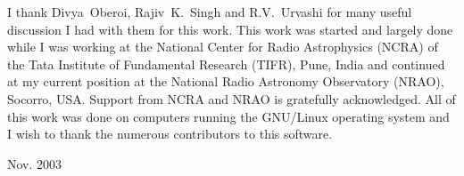 \documentclass[acmtoms,acmnow]{acmtrans2m}
\begin{document}
\begin{acks}
I thank Divya~Oberoi, Rajiv~K.~Singh and R.V.~Urvashi for many useful
discussion I had with them for this work.  This work was started and
largely done while I was working at the National Center for Radio
Astrophysics (NCRA) of the Tata Institute of Fundamental Research
(TIFR), Pune, India and continued at my current position at the
National Radio Astronomy Observatory (NRAO), Socorro, USA.  Support
from NCRA and NRAO is gratefully acknowledged.  All of this work was
done on computers running the GNU/Linux operating system and I wish to
thank the numerous contributors to this software.
\end{acks}




\begin{received}
Nov. 2003
\end{received}
\end{document}
